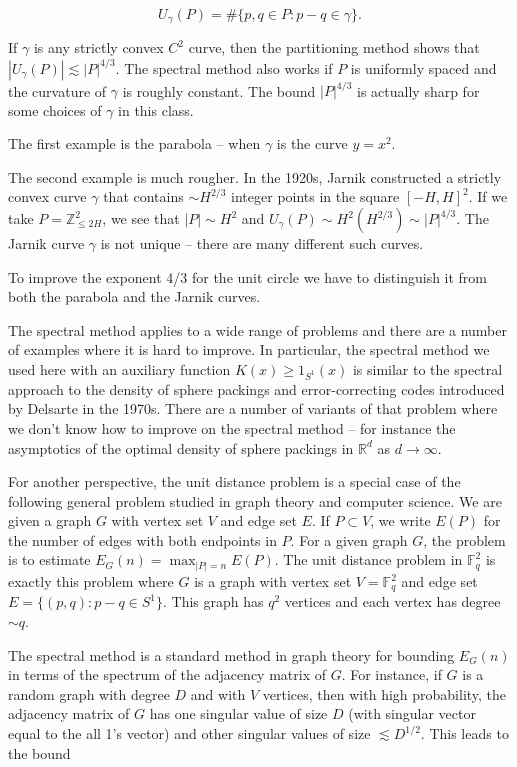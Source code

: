 \documentclass{amsart}
\newcommand{\FF}{\mathbb{F}}
\newcommand{\ZZ}{\mathbb{Z}}
\newcommand{\RR}{\mathbb{R}}
\begin{document}
$$ U_\gamma(P) = \# \{ p, q \in P : p - q \in \gamma \}. $$

\noindent If $\gamma$ is any strictly convex $C^2$ curve, then the partitioning method shows that $ |U_\gamma(P)| \lesssim |P|^{4/3}$.   The spectral method 
also works if $P$ is uniformly spaced and the curvature of $\gamma$ is roughly constant.  The bound $|P|^{4/3}$ is actually sharp for some choices of $\gamma$ in this class.

The first example is the parabola -- when $\gamma$ is the curve $y = x^2$.

The second example is much rougher.     In the 1920s, Jarnik constructed a strictly convex curve $\gamma$ that contains $\sim H^{2/3}$ integer points in the square $[-H,H]^2$.  If we take $P = \ZZ_{\le 2H}^2$,   we see that $|P| \sim H^2$ and $U_\gamma(P) \sim H^2 (H^{2/3}) \sim |P|^{4/3}$.  The Jarnik curve $\gamma$ is not unique -- there are many different such curves.  

To improve the exponent 4/3 for the unit circle we have to distinguish it from both the parabola and the Jarnik curves.

The spectral method applies to a wide range of problems and there are a number of examples where it is hard to improve.  In particular, the spectral method we used here with an auxiliary function $K(x) \ge 1_{S^1}(x)$ is similar to the spectral approach to the density of sphere packings and error-correcting codes introduced by Delsarte in the 1970s.  There are a number of variants of that problem where we don't know how to improve on the spectral method -- for instance the asymptotics of the optimal density of sphere packings in $\RR^d$ as $d \rightarrow \infty$.

For another perspective,  the unit distance problem is a special case of the following general problem studied in graph theory and computer science.  We are given a graph $G$ with vertex set $V$ and edge set $E$.  If $P \subset V$, we write $E(P)$ for the number of edges with both endpoints in $P$.   For a given graph $G$, the problem is to estimate $E_G(n) = \max_{|P| =n } E(P)$.  The unit distance problem in $\FF_q^2$ is exactly this problem where $G$ is a graph with vertex set $V = \FF_q^2$ and edge set $E = \{ (p,q): p - q \in S^1 \}$.  This graph has $q^2$ vertices and each vertex has degree $\sim q$.  

 The spectral method is a standard method in graph theory for bounding $E_G(n)$ in terms of the spectrum of the adjacency matrix of $G$.  For instance, if $G$ is a random graph with degree $D$ and with $V$ vertices, then with high probability, the adjacency matrix of $G$ has one singular value of size $D$ (with singular vector equal to the all 1's vector) and other singular values of size $\lesssim D^{1/2}$.   This leads to the bound
\end{document}
